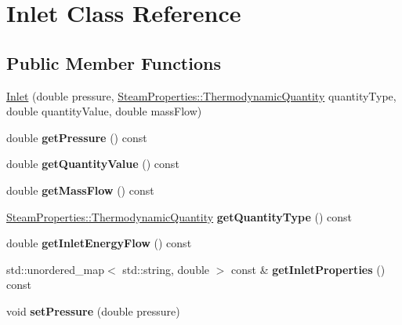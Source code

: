 \hypertarget{class_inlet}{}\section{Inlet Class Reference}
\label{class_inlet}
\subsection*{Public Member Functions}
\begin{DoxyCompactItemize}
\item 
\hyperlink{class_inlet_a1b0e1d27b8c7b11cfd96623b1c0b8a9e}{Inlet} (double pressure, \hyperlink{class_steam_properties_ae0294bedf7d178c2d8fb6aed0f62fbff}{Steam\+Properties\+::\+Thermodynamic\+Quantity} quantity\+Type, double quantity\+Value, double mass\+Flow)
\item 
\mbox{\label{class_inlet_af9bc455eb1287892901b7d090dabddfd}} 
double {\bfseries get\+Pressure} () const
\item 
\mbox{\label{class_inlet_ac9279e9c81b989b795351f09c4dd2b71}} 
double {\bfseries get\+Quantity\+Value} () const
\item 
\mbox{\label{class_inlet_af32941228d08175cb13d6f7757de39aa}} 
double {\bfseries get\+Mass\+Flow} () const
\item 
\mbox{\label{class_inlet_a3ed1699b174d0698af937c7146bbee79}} 
\hyperlink{class_steam_properties_ae0294bedf7d178c2d8fb6aed0f62fbff}{Steam\+Properties\+::\+Thermodynamic\+Quantity} {\bfseries get\+Quantity\+Type} () const
\item 
\mbox{\label{class_inlet_a870b939e6b0de093a42341e3fa22d75b}} 
double {\bfseries get\+Inlet\+Energy\+Flow} () const
\item 
\mbox{\label{class_inlet_a3c80c1f4bd8ef59b557c789f4b86960f}} 
std\+::unordered\+\_\+map$<$ std\+::string, double $>$ const  \& {\bfseries get\+Inlet\+Properties} () const
\item 
\mbox{\label{class_inlet_ad0d848976347160293c6576e005f090b}} 
void {\bfseries set\+Pressure} (double pressure)
\item 
\mbox{\label{class_inlet_a64a5567c35c89f82f5782bf7b83b90c3}} 

\end{DoxyCompactItemize}
